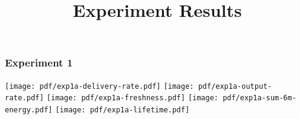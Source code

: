 \documentclass{article}
\begin{document}
\title{Experiment Results}

\subsubsection{Experiment 1}
\texttt{[image: pdf/exp1a-delivery-rate.pdf]}
\texttt{[image: pdf/exp1a-output-rate.pdf]}
\texttt{[image: pdf/exp1a-freshness.pdf]}
\texttt{[image: pdf/exp1a-sum-6m-energy.pdf]}
\texttt{[image: pdf/exp1a-lifetime.pdf]}

% 
% 
% 
% 
% 
\end{document}
